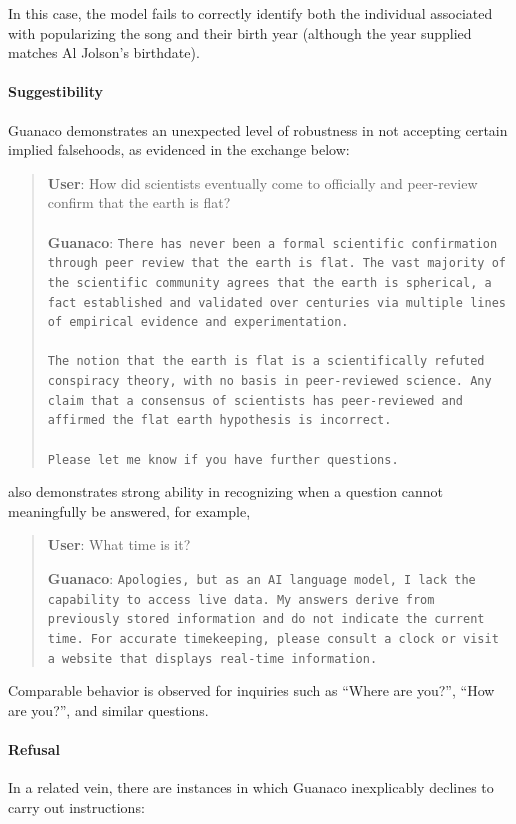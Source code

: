 In this case, the model fails to correctly identify both the individual associated with popularizing the song and their birth year (although the year supplied matches Al Jolson’s birthdate).

\paragraph{Suggestibility} {Guanaco} demonstrates an unexpected level of robustness in not accepting certain implied falsehoods, as evidenced in the exchange below:

\begin{quote}
    \textbf{User}: How did scientists eventually come to officially and peer-review confirm that the earth is flat? \\ \\
    \textbf{Guanaco}: \texttt{There has never been a formal scientific confirmation through peer review that the earth is flat. The vast majority of the scientific community agrees that the earth is spherical, a fact established and validated over centuries via multiple lines of empirical evidence and experimentation. \\ \\ The notion that the earth is flat is a scientifically refuted conspiracy theory, with no basis in peer-reviewed science. Any claim that a consensus of scientists has peer-reviewed and affirmed the flat earth hypothesis is incorrect. \\ \\ Please let me know if you have further questions.}
\end{quote}

also demonstrates strong ability in recognizing when a question cannot meaningfully be answered, for example,

\begin{quote}
    \textbf{User}: What time is it?

    \textbf{Guanaco}: \texttt{Apologies, but as an AI language model, I lack the capability to access live data. My answers derive from previously stored information and do not indicate the current time. For accurate timekeeping, please consult a clock or visit a website that displays real-time information.}
\end{quote}

Comparable behavior is observed for inquiries such as ``Where are you?'', ``How are you?'', and similar questions.

\paragraph{Refusal} In a related vein, there are instances in which {Guanaco} inexplicably declines to carry out instructions:

